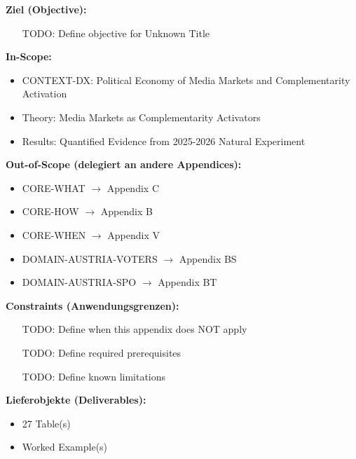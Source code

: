 \begin{tcolorbox}[
    colback=orange!5!white,
    colframe=orange!75!black,
    title={\textbf{Appendix Scope: Ziel / In-Scope / Out-of-Scope / Constraints}},
    fonttitle=\bfseries
]

\textbf{Ziel (Objective):}
\begin{itemize}[nosep]
    \item [TODO: Define objective for Unknown Title]
\end{itemize}

\textbf{In-Scope:}
\begin{itemize}[nosep]
    \item CONTEXT-DX: Political Economy of Media Markets and Complementarity Activation
    \item Theory: Media Markets as Complementarity Activators
    \item Results: Quantified Evidence from 2025-2026 Natural Experiment
\end{itemize}

\textbf{Out-of-Scope (delegiert an andere Appendices):}
\begin{itemize}[nosep]
    \item CORE-WHAT $\rightarrow$ Appendix C
    \item CORE-HOW $\rightarrow$ Appendix B
    \item CORE-WHEN $\rightarrow$ Appendix V
    \item DOMAIN-AUSTRIA-VOTERS $\rightarrow$ Appendix BS
    \item DOMAIN-AUSTRIA-SPO $\rightarrow$ Appendix BT
\end{itemize}

\textbf{Constraints (Anwendungsgrenzen):}
\begin{itemize}[nosep]
    \item [TODO: Define when this appendix does NOT apply]
    \item [TODO: Define required prerequisites]
    \item [TODO: Define known limitations]
\end{itemize}

\textbf{Lieferobjekte (Deliverables):}
\begin{itemize}[nosep]
    \item 27 Table(s)
    \item Worked Example(s)
\end{itemize}

\end{tcolorbox}


